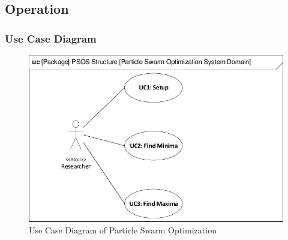 \subsection{Operation}
\blindtext


\subsubsection{Use Case Diagram} \label{requirementspecification:usecasediagrams}

\blindtext

\begin{figure}[H]
	\centering
	\includegraphics[width=0.8\linewidth]{diagram/uc_particle_swarm_optimization_system.pdf}
	\caption{Use Case Diagram of Particle Swarm Optimization}
	\label{fig:ucdiagram}
\end{figure}






